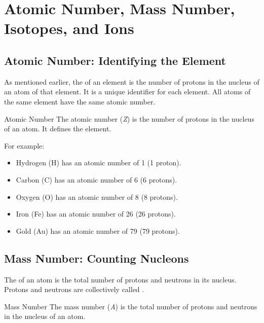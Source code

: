 \section{Atomic Number, Mass Number, Isotopes, and Ions}

\subsection{Atomic Number: Identifying the Element}


As mentioned earlier, the  of an element is the number of protons in the nucleus of an atom of that element.  It is a unique identifier for each element.  All atoms of the same element have the same atomic number.

\begin{keyconcept}{Atomic Number}
The atomic number (\textit{Z}) is the number of protons in the nucleus of an atom. It defines the element.
\end{keyconcept}

For example:
\begin{itemize}
    \item Hydrogen (H) has an atomic number of 1 (1 proton).
    \item Carbon (C) has an atomic number of 6 (6 protons).
    \item Oxygen (O) has an atomic number of 8 (8 protons).
    \item Iron (Fe) has an atomic number of 26 (26 protons).
    \item Gold (Au) has an atomic number of 79 (79 protons).
\end{itemize}

\subsection{Mass Number: Counting Nucleons}


The  of an atom is the total number of protons and neutrons in its nucleus. Protons and neutrons are collectively called .

\begin{keyconcept}{Mass Number}
The mass number (\textit{A}) is the total number of protons and neutrons in the nucleus of an atom.
\end{keyconcept}

